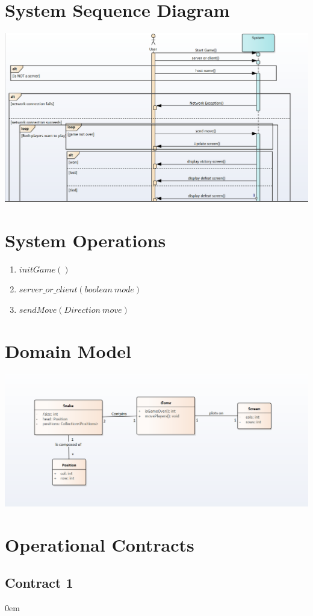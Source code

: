 \documentclass[titlepage]{article}
\begin{document}
	\section{System Sequence Diagram}
	\includegraphics[scale=.75]{SSD}
	
	\section{System Operations}
	\begin{enumerate}
		\item $initGame()$
		\item $server\_or\_client(boolean~mode)$
		\item $sendMove(Direction~move)$
	\end{enumerate}
	
	\section{Domain Model}
		\includegraphics[scale=.75]{DM}
	
	\section{Operational Contracts}
	\subsection{Contract 1}
	\itemsep0em 
	
\end{document}
